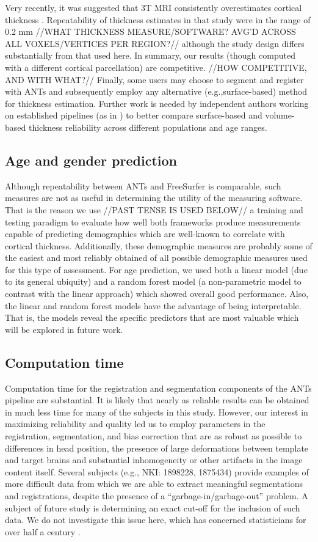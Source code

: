 Very recently, it was suggested that 3T MRI
consistently overestimates cortical thickness \cite{lusebrink2013}.
Repeatability of thickness estimates in that study were in the range
of 0.2 mm //WHAT THICKNESS MEASURE/SOFTWARE?
AVG'D ACROSS ALL VOXELS/VERTICES PER REGION?//
although the study design differs substantially from that used here.
In summary, our results (though computed
with a different cortical parcellation) are competitive.  //HOW COMPETITIVE, AND WITH WHAT?//
Finally, some users may choose to segment and register
with ANTs and subsequently employ any alternative (e.g.,surface-based)
method for thickness estimation.  Further work is needed by
independent authors working on established pipelines (as in \cite{lusebrink2013,jovicich2013})
to better compare surface-based and volume-based thickness reliability
across different populations and age ranges. 

\subsection{Age and gender prediction} 
Although repeatability between ANTs and FreeSurfer is comparable,
such measures are not as useful in determining the utility of the 
measuring software.  That is the reason we use //PAST TENSE IS USED BELOW//
a training and testing paradigm to evaluate how well both frameworks produce measurements
capable of predicting demographics which are well-known to correlate
with cortical thickness.  Additionally, these demographic measures are
probably some of the easiest and most reliably obtained of all possible
demographic measures used for this type of assessment.  For age prediction,
we used both a linear model (due to its general ubiquity) and a random
forest model (a non-parametric model to contrast with the linear approach)
which showed overall good performance.  Also, the linear  and
random forest models have the advantage of being
interpretable.  That is, the models reveal the specific predictors
that are most valuable which will be explored in future work.  

\subsection{Computation time}
Computation time for the registration and segmentation components of
the ANTs pipeline are substantial.  It is likely that nearly as reliable
results can be obtained in much less time for many of the subjects in
this study.  However, our interest in
maximizing reliability and quality led us to employ parameters in the
registration, segmentation, and bias correction that are as robust as
possible to differences in head position, the presence of large
deformations between template and target brains and substantial
inhomogeneity or other artifacts in the image content itself.  Several
subjects (e.g., NKI: 1898228, 1875434) provide examples of more difficult
data from which we are able to
extract meaningful segmentations and registrations, despite the presence of a
``garbage-in/garbage-out'' problem.  A subject of future study is
determining an exact cut-off for the inclusion of such data.  We do not
investigate this issue here, which has concerned statisticians for over
half a century \cite{Hampel2001}. 

